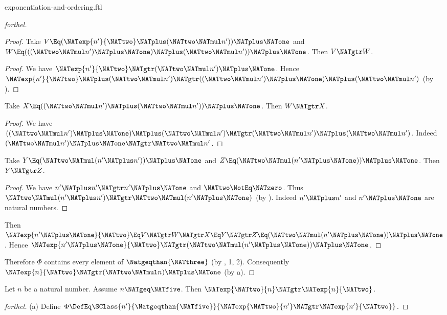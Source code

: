 \documentclass{stex}
\begin{document}
\begin{smodule}{exponentiation-and-ordering.ftl}
\begin{proof}[forthel]
\begin{proof}
    Take $V \Eq (\NATexp{n'}{\NATtwo} \NATplus (\NATtwo \NATmul n')) \NATplus \NATone$ and $W \Eq (((\NATtwo \NATmul n') \NATplus \NATone) \NATplus (\NATtwo \NATmul n')) \NATplus \NATone$.
    Then $V \NATgtr W$.
    \begin{proof}
      We have $\NATexp{n'}{\NATtwo} \NATgtr (\NATtwo \NATmul n') \NATplus \NATone$.
      Hence $\NATexp{n'}{\NATtwo} \NATplus (\NATtwo \NATmul n') \NATgtr ((\NATtwo \NATmul n') \NATplus \NATone) \NATplus (\NATtwo \NATmul n')$ (by ).
    \end{proof}

    Take $X \Eq ((\NATtwo \NATmul n') \NATplus (\NATtwo \NATmul n')) \NATplus \NATone$.
    Then $W \NATgtr X$.
    \begin{proof}
      We have $((\NATtwo \NATmul n') \NATplus \NATone) \NATplus (\NATtwo \NATmul n') \NATgtr (\NATtwo \NATmul n') \NATplus (\NATtwo \NATmul n')$.
      Indeed $(\NATtwo \NATmul n') \NATplus \NATone \NATgtr \NATtwo \NATmul n'$.
    \end{proof}

    Take $Y \Eq (\NATtwo \NATmul (n' \NATplus n')) \NATplus \NATone$ and $Z \Eq (\NATtwo \NATmul (n' \NATplus \NATone)) \NATplus \NATone$.
    Then $Y \NATgtr Z$.
    \begin{proof}
      We have $n' \NATplus n' \NATgtr n' \NATplus \NATone$ and $\NATtwo \NotEq \NATzero$.
      Thus $\NATtwo \NATmul (n' \NATplus n') \NATgtr \NATtwo \NATmul (n' \NATplus \NATone)$ (by ).
      Indeed $n' \NATplus n'$ and $n' \NATplus \NATone$ are natural numbers.
    \end{proof}

    Then $\NATexp{n' \NATplus \NATone}{\NATtwo} \Eq V \NATgtr W \NATgtr X \Eq Y \NATgtr Z \Eq (\NATtwo \NATmul (n' \NATplus \NATone)) \NATplus \NATone$.
    Hence $\NATexp{n' \NATplus \NATone}{\NATtwo} \NATgtr (\NATtwo \NATmul (n' \NATplus \NATone)) \NATplus \NATone$.
  \end{proof}

  Therefore $\Phi$ contains every element of $\Natgeqthan{\NATthree}$ (by , 1, 2).
  Consequently $\NATexp{n}{\NATtwo} \NATgtr (\NATtwo \NATmul n) \NATplus \NATone$ (by a).
\end{proof}

\begin{proposition}[forthel]
  Let $n$ be a natural number.
  Assume $n \NATgeq \NATfive$.
  Then $\NATexp{\NATtwo}{n} \NATgtr \NATexp{n}{\NATtwo}$.
\end{proposition}
\begin{proof}[forthel]
  (a) Define $\Phi \DefEq \SClass{n'}{\Natgeqthan{\NATfive}}{\NATexp{\NATtwo}{n'} \NATgtr \NATexp{n'}{\NATtwo}}$.


\end{proof}
\end{smodule}
\end{document}
